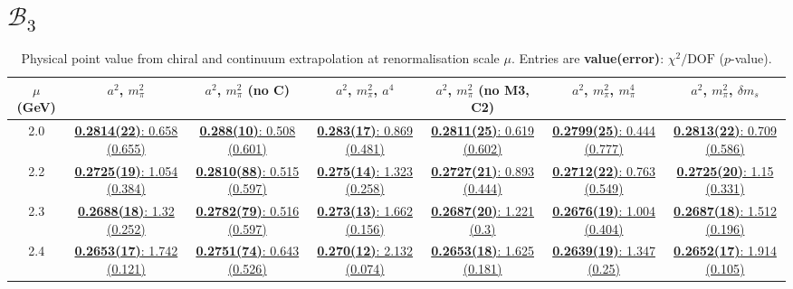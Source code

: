 \documentclass[12pt]{extarticle}
\begin{document}
\section{$\mathcal{B}_3$}
\begin{table}[h!]
\begin{center}
\begin{tabular}{|c|c|c|c|c|c|c|}
\hline
$\mu$ (GeV) & $a^2$, $m_\pi^2$& $a^2$, $m_\pi^2$ (no C)& $a^2$, $m_\pi^2$, $a^4$& $a^2$, $m_\pi^2$ (no M3, C2)& $a^2$, $m_\pi^2$, $m_\pi^4$& $a^2$, $m_\pi^2$, $\delta m_s$\\
\hline
2.0& \hyperlink{SSmPP/SUSY/bag_a2m2_20.pdf.1}{\textbf{0.2814(22)}: 0.658 (0.655)} & \hyperlink{SSmPP/SUSY/bag_a2m2noC_20.pdf.1}{\textbf{0.288(10)}: 0.508 (0.601)} & \hyperlink{SSmPP/SUSY/bag_a2a4m2_20.pdf.1}{\textbf{0.283(17)}: 0.869 (0.481)} & \hyperlink{SSmPP/SUSY/bag_a2m2mcut_20.pdf.1}{\textbf{0.2811(25)}: 0.619 (0.602)} & \hyperlink{SSmPP/SUSY/bag_a2m2m4_20.pdf.1}{\textbf{0.2799(25)}: 0.444 (0.777)} & \hyperlink{SSmPP/SUSY/bag_a2m2delm_20.pdf.1}{\textbf{0.2813(22)}: 0.709 (0.586)}\\
2.2& \hyperlink{SSmPP/SUSY/bag_a2m2_22.pdf.1}{\textbf{0.2725(19)}: 1.054 (0.384)} & \hyperlink{SSmPP/SUSY/bag_a2m2noC_22.pdf.1}{\textbf{0.2810(88)}: 0.515 (0.597)} & \hyperlink{SSmPP/SUSY/bag_a2a4m2_22.pdf.1}{\textbf{0.275(14)}: 1.323 (0.258)} & \hyperlink{SSmPP/SUSY/bag_a2m2mcut_22.pdf.1}{\textbf{0.2727(21)}: 0.893 (0.444)} & \hyperlink{SSmPP/SUSY/bag_a2m2m4_22.pdf.1}{\textbf{0.2712(22)}: 0.763 (0.549)} & \hyperlink{SSmPP/SUSY/bag_a2m2delm_22.pdf.1}{\textbf{0.2725(20)}: 1.15 (0.331)}\\
2.3& \hyperlink{SSmPP/SUSY/bag_a2m2_23.pdf.1}{\textbf{0.2688(18)}: 1.32 (0.252)} & \hyperlink{SSmPP/SUSY/bag_a2m2noC_23.pdf.1}{\textbf{0.2782(79)}: 0.516 (0.597)} & \hyperlink{SSmPP/SUSY/bag_a2a4m2_23.pdf.1}{\textbf{0.273(13)}: 1.662 (0.156)} & \hyperlink{SSmPP/SUSY/bag_a2m2mcut_23.pdf.1}{\textbf{0.2687(20)}: 1.221 (0.3)} & \hyperlink{SSmPP/SUSY/bag_a2m2m4_23.pdf.1}{\textbf{0.2676(19)}: 1.004 (0.404)} & \hyperlink{SSmPP/SUSY/bag_a2m2delm_23.pdf.1}{\textbf{0.2687(18)}: 1.512 (0.196)}\\
2.4& \hyperlink{SSmPP/SUSY/bag_a2m2_24.pdf.1}{\textbf{0.2653(17)}: 1.742 (0.121)} & \hyperlink{SSmPP/SUSY/bag_a2m2noC_24.pdf.1}{\textbf{0.2751(74)}: 0.643 (0.526)} & \hyperlink{SSmPP/SUSY/bag_a2a4m2_24.pdf.1}{\textbf{0.270(12)}: 2.132 (0.074)} & \hyperlink{SSmPP/SUSY/bag_a2m2mcut_24.pdf.1}{\textbf{0.2653(18)}: 1.625 (0.181)} & \hyperlink{SSmPP/SUSY/bag_a2m2m4_24.pdf.1}{\textbf{0.2639(19)}: 1.347 (0.25)} & \hyperlink{SSmPP/SUSY/bag_a2m2delm_24.pdf.1}{\textbf{0.2652(17)}: 1.914 (0.105)}\\
\hline
\end{tabular}
\caption{Physical point value from chiral and continuum extrapolation at renormalisation scale $\mu$. Entries are \textbf{value(error)}: $\chi^2/\text{DOF}$ ($p$-value).}
\end{center}
\end{table}
\end{document}
